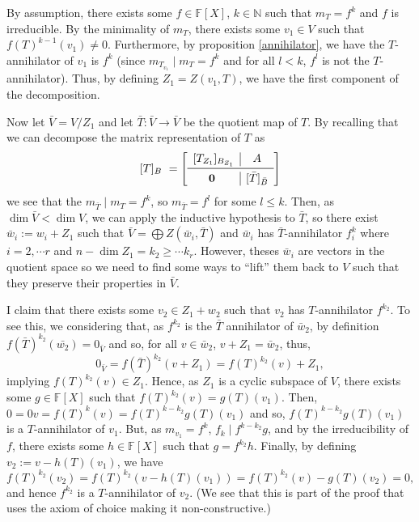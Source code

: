 \documentclass[
]{article}
\theoremstyle{definition}
\theoremstyle{definition}
\begin{document}
By assumption, there exists some \(f \in \mathbb{F}[X]\),
\(k \in \mathbb{N}\) such that \(m_T = f^k\) and \(f\) is irreducible.
By the minimality of \(m_T\), there exists some \(v_1 \in V\) such that
\(f(T)^{k - 1}(v_1) \neq 0\). Furthermore, by proposition
\ref{annihilator}, we have the \(T\)-annihilator of \(v_1\) is \(f^k\)
(since \(m_{T_{v_1}} \mid m_T = f^k\) and for all \(l < k\), \(f^l\) is
not the \(T\)-annihilator). Thus, by defining \(Z_1 = Z(v_1, T)\), we
have the first component of the decomposition.

Now let \(\bar{V} = V / Z_1\) and let \(\bar{T} : \bar{V} \to \bar{V}\)
be the quotient map of \(T\). By recalling that we can decompose the
matrix representation of \(T\) as \[[T]_B = 
    \left[
      \begin{array}{c|c}
        [T_{Z_1}]_{B_{Z_1}} & A \\
        \midrule
        \mathbf{0} & [\bar{T}]_{\bar{B}}
      \end{array}
    \right]\] we see that the \(m_{\bar{T}} \mid m_{T} = f^k\), so
\(m_{\bar{T}} = f^l\) for some \(l \le k\). Then, as
\(\dim \bar{V} < \dim V\), we can apply the inductive hypothesis to
\(\bar{T}\), so there exist \(\bar{w}_i := w_i + Z_1\) such that
\(\bar{V} = \bigoplus Z(\bar{w}_i, \bar{T})\) and \(\bar{w}_i\) has
\(\bar{T}\)-annihilator \(f^k_i\) where \(i = 2, \cdots r\) and
\(n - \dim Z_1 = k_2 \ge \cdots k_r\). However, theses \(\bar{w}_i\) are
vectors in the quotient space so we need to find some ways to ``lift''
them back to \(V\) such that they preserve their properties in
\(\bar{V}\).

I claim that there exists some \(v_2 \in Z_1 + w_2\) such that \(v_2\)
has \(T\)-annihilator \(f^{k_2}\). To see this, we considering that, as
\(f^{k_2}\) is the \(\bar{T}\) annihilator of \(\bar{w}_2\), by
definition \(f(\bar{T})^{k_2}(\bar{w_2}) = 0_{\bar{V}}\) and so, for all
\(v \in \bar{w}_2\), \(v + Z_1 = \bar{w}_2\), thus,
\[0_{\bar{V}} = f(\bar{T})^{k_2}(v + Z_1) = f(T)^{k_2}(v) + Z_1,\]
implying \(f(T)^{k_2}(v) \in Z_1\). Hence, as \(Z_1\) is a cyclic
subspace of \(V\), there exists some \(g \in \mathbb{F}[X]\) such that
\(f(T)^{k_2}(v) = g(T)(v_1)\). Then,
\(0 = 0 v = f(T)^k (v) = f(T)^{k - k_2}g(T)(v_1)\) and so,
\(f(T)^{k - k_2}g(T)(v_1)\) is a \(T\)-annihilator of \(v_1\). But, as
\(m_{v_1} = f^k\), \(f_k \mid f^{k - k_2}g\), and by the irreducibility
of \(f\), there exists some \(h \in \mathbb{F}[X]\) such that
\(g = f^{k_2} h\). Finally, by defining \(v_2 := v - h(T)(v_1)\), we
have
\[f(T)^{k_2}(v_2) = f(T)^{k_2}(v - h(T)(v_1)) = f(T)^{k_2}(v) - g(T)(v_2) = 0,\]
and hence \(f^{k_2}\) is a \(T\)-annihilator of \(v_2\). (We see that
this is part of the proof that uses the axiom of choice making it
non-constructive.)
\end{document}

